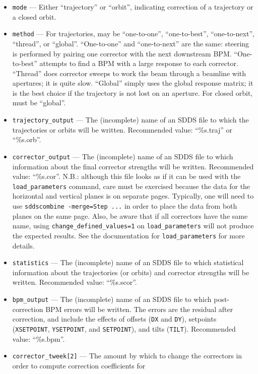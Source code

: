 \documentclass[11pt]{article}
\begin{document}
\begin{itemize}

\item \verb|mode| --- Either ``trajectory'' or ``orbit'', indicating
correction of a trajectory or a closed orbit.
\item \verb|method| --- For trajectories, may be ``one-to-one'', ``one-to-best'', ``one-to-next'', ``thread'', or ``global''.  
``One-to-one'' and ``one-to-next'' are the same: steering is performed by pairing one corrector with the next downstream BPM.
``One-to-best'' attempts to find a BPM with a large response to each corrector.  ``Thread'' does corrector sweeps to work the
beam through a beamline with apertures; it is quite slow.  ``Global'' simply uses the global response matrix; it is the best
choice if the trajectory is not lost on an aperture.
For closed orbit, must be ``global''.
\item \verb|trajectory_output| --- The (incomplete) name of an SDDS file to which the trajectories or orbits will be written.  Recommended value: ``\%s.traj'' or ``\%s.orb''.  
\item \verb|corrector_output| --- The (incomplete) name of an SDDS file to which information about the final corrector strengths will be written. Recommended value: ``\%s.cor''.  N.B.: although this file looks as if it can be used with the \verb|load_parameters| command, care must be exercised because the data for the
horizontal and vertical planes is on separate pages. Typically, one will need to use \verb|sddscombine -merge=Step ...| in order to place the data from both planes on the same page. Also, be aware that if all correctors have the same name, using \verb|change_defined_values=1| on \verb|load_parameters| will not produce the expected results. See the documentation for \verb|load_parameters| for more details.
\item \verb|statistics| --- The (incomplete) name of an SDDS file to which statistical information about the
trajectories (or orbits) and corrector strengths will be written.  Recommended value: ``\%s.scor''.
\item \verb|bpm_output| --- The (incomplete) name of an SDDS file to which post-correction BPM errors will be written. The
  errors are the residual after correction, and include the effects of offsets (\verb|DX| and \verb|DY|), setpoints
  (\verb|XSETPOINT|, \verb|YSETPOINT|, and \verb|SETPOINT|), and tilts (\verb|TILT|).
  Recommended value: ``\%s.bpm''.
\item \verb|corrector_tweek[2]| --- The amount by which to change the correctors in order to compute correction coefficients for

\end{itemize}
\end{document}
